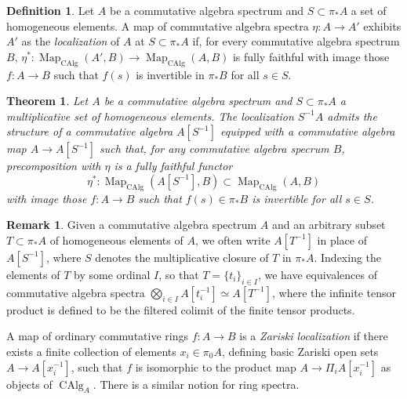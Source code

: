 \documentclass[12pt]{article}
\newtheorem{theorem}{Theorem}[subsection]
\theoremstyle{definition}
\newtheorem{definition}{Definition}[subsection]
\newtheorem{remark}{Remark}[subsection]
\DeclareMathOperator{\CAlg}{CAlg}
\DeclareMathOperator{\Map}{Map}
\begin{document}
\begin{definition}
Let $A$ be a commutative algebra spectrum and $S\subset\pi_* A$ a set of homogeneous elements.
A map of commutative algebra spectra $\eta:A\to A'$ exhibits $A'$ as the {\em localization} of $A$ at $S\subset\pi_* A$ if, for every commutative algebra spectrum $B$, $\eta^*:\Map_{\CAlg}(A',B)\to\Map_{\CAlg}(A,B)$ is fully faithful with image those $f:A\to B$ such that $f(s)$ is invertible in $\pi_* B$ for all $s\in S$.
\end{definition}
\begin{theorem}{\em \cite[Example 7.5.0.7]{HA}}
Let $A$ be a commutative algebra spectrum and $S\subset\pi_* A$ a multiplicative set of homogeneous elements.
The localization $S^{-1} A$ admits the structure of a commutative algebra $A[S^{-1}]$ equipped with a commutative algebra map $A\to A[S^{-1}]$ such that, for any commutative algebra specrum $B$, precomposition with $\eta$ is a fully faithful functor
\[
\eta^*:\Map_{\CAlg}(A[S^{-1}],B)\subset\Map_{\CAlg}(A,B)
\]
with image those $f:A\to B$ such that $f(s)\in\pi_* B$ is invertible for all $s\in S$.
\end{theorem}

\begin{remark}
Given a commutative algebra spectrum $A$ and an arbitrary subset $T\subset\pi_* A$ of homogeneous elements of $A$, we often write $A[T^{-1}]$ in place of $A[S^{-1}]$, where $S$ denotes the multiplicative closure of $T$ in $\pi_*A$.
Indexing the elements of $T$ by some ordinal $I$, so that $T=\{t_i\}_{i\in I}$, we have equivalences of commutative algebra spectra $\bigotimes_{i\in I} A[t_i^{-1}]\simeq A[T^{-1}]$, where the infinite tensor product is defined to be the filtered colimit of the finite tensor products.
\end{remark}

A map of ordinary commutative rings $f:A\to B$ is a {\em Zariski localization} if there exists a finite collection of elements $x_i\in\pi_0 A$, defining basic Zariski open sets $A\to A[x_i^{-1}]$, such that $f$ is isomorphic to the product map $A\to\Pi_i A[x_i^{-1}]$ as objects of $\CAlg_A$.
There is a similar notion for ring spectra.
\end{document}
